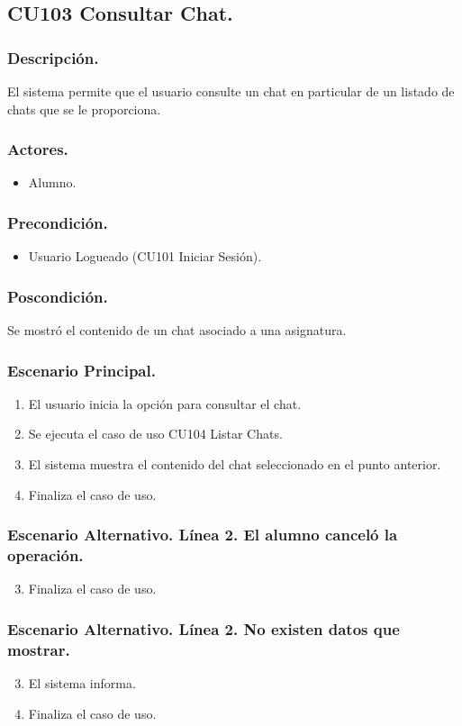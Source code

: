 \subsection{CU103 Consultar Chat.}
\subsubsection{Descripci\'{o}n.}
El sistema permite que el usuario consulte un chat en particular de un listado de chats que se le proporciona.
\subsubsection{Actores.}
\begin{itemize}
\item Alumno.
\end{itemize}
\subsubsection{Precondici\'{o}n.}
\begin{itemize}
\item Usuario Logueado (CU101 Iniciar Sesi\'{o}n).
\end{itemize}
\subsubsection{Poscondici\'{o}n.}
Se mostr\'{o} el contenido de un chat asociado a una asignatura.
\subsubsection{Escenario Principal.}
\begin{enumerate}
\item El usuario inicia la opci\'{o}n para consultar el chat.
\item Se ejecuta el caso de uso CU104 Listar Chats.
\item El sistema muestra el contenido del chat seleccionado en el punto anterior.
\item Finaliza el caso de uso.
\end{enumerate}

\subsubsection{Escenario Alternativo. L\'{i}nea 2. El alumno cancel\'{o} la operaci\'{o}n.}
\begin{enumerate}
\setcounter{enumi}{2}
\item Finaliza el caso de uso.
\end{enumerate}

\subsubsection{Escenario Alternativo. L\'{i}nea 2. No existen datos que mostrar.}
\begin{enumerate}
\setcounter{enumi}{2}
\item El sistema informa.
\item Finaliza el caso de uso.
\end{enumerate}
